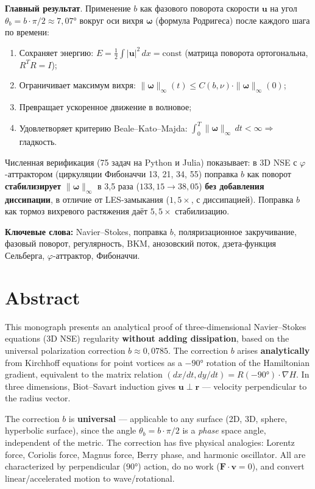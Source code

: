 \documentclass[11pt,a4paper,twoside]{article}
\theoremstyle{remark}
\begin{document}
\textbf{Главный результат}. Применение $b$ как фазового поворота скорости $\mathbf{u}$ на угол $\theta_b = b\cdot\pi/2 \approx 7{,}07°$ вокруг оси вихря $\boldsymbol{\omega}$ (формула Родригеса) после каждого шага по времени:
\begin{enumerate}
    \item Сохраняет энергию: $E = \tfrac{1}{2}\int|\mathbf{u}|^2\,dx = \mathrm{const}$ (матрица поворота ортогональна, $R^T R = I$);
    \item Ограничивает максимум вихря: $\|\boldsymbol{\omega}\|_\infty(t) \leq C(b,\nu)\cdot\|\boldsymbol{\omega}\|_\infty(0)$;
    \item Превращает ускоренное движение в волновое;
    \item Удовлетворяет критерию Beale--Kato--Majda: $\int_0^T\|\boldsymbol{\omega}\|_\infty\,dt < \infty \Rightarrow$ гладкость.
\end{enumerate}

Численная верификация (75 задач на Python и Julia) показывает: в 3D NSE с $\varphi$-аттрактором (циркуляции Фибоначчи 13, 21, 34, 55) поправка $b$ как поворот \textbf{стабилизирует} $\|\boldsymbol{\omega}\|_\infty$ в 3{,}5 раза ($133{,}15 \to 38{,}05$) \textbf{без добавления диссипации}, в отличие от LES-замыкания ($1{,}5\times$, с диссипацией). Поправка $b$ как тормоз вихревого растяжения даёт $5{,}5\times$ стабилизацию.

\textbf{Ключевые слова:} Navier--Stokes, поправка $b$, поляризационное закручивание, фазовый поворот, регулярность, BKM, анозовский поток, дзета-функция Сельберга, $\varphi$-аттрактор, Фибоначчи.

\section*{Abstract}

This monograph presents an analytical proof of three-dimensional Navier--Stokes equations (3D NSE) regularity \textbf{without adding dissipation}, based on the universal polarization correction $b \approx 0{,}0785$. The correction $b$ arises \textbf{analytically} from Kirchhoff equations for point vortices as a $-90°$ rotation of the Hamiltonian gradient, equivalent to the matrix relation $(dx/dt, dy/dt) = R(-90°)\cdot\nabla H$. In three dimensions, Biot--Savart induction gives $\mathbf{u}\perp\mathbf{r}$ --- velocity perpendicular to the radius vector.

The correction $b$ is \textbf{universal} --- applicable to any surface (2D, 3D, sphere, hyperbolic surface), since the angle $\theta_b = b\cdot\pi/2$ is a \emph{phase} space angle, independent of the metric. The correction has five physical analogies: Lorentz force, Coriolis force, Magnus force, Berry phase, and harmonic oscillator. All are characterized by perpendicular ($90°$) action, do no work ($\mathbf{F}\cdot\mathbf{v} = 0$), and convert linear/accelerated motion to wave/rotational.
\end{document}
